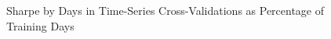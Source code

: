 \documentclass{article}
\begin{document}
\begin{figure}[h]
    \label{fig:time_series_tscv_size_multiple}
    \centering
    \caption{Sharpe by Days in Time-Series Cross-Validations as Percentage of Training Days}
\end{figure}
\end{document}
